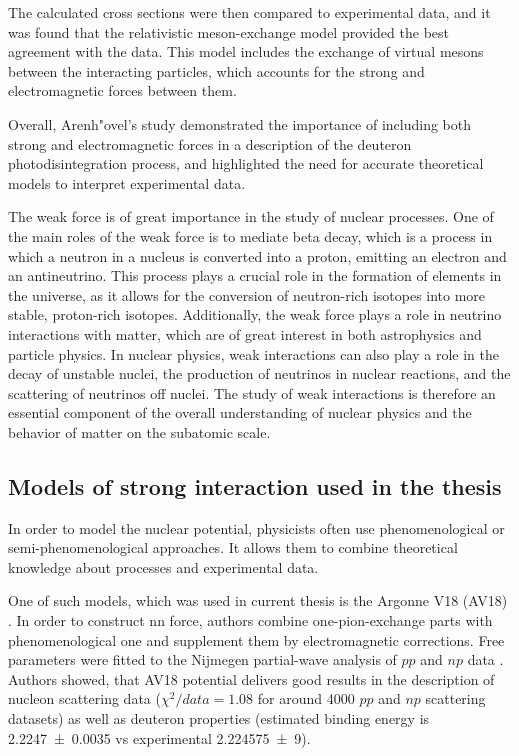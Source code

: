 The calculated cross sections were then compared to experimental data, and it was
found that the relativistic meson-exchange model provided
the best agreement with the data. This model includes the exchange of virtual mesons
between the interacting particles, which accounts for
the strong and electromagnetic forces between them.

Overall, Arenh"{o}vel's study demonstrated the importance of including both strong
and electromagnetic forces in a description of the deuteron photodisintegration process,
and highlighted the need for accurate theoretical models to interpret experimental data.


The weak force is of great importance in the study of nuclear processes. One of the main roles of the weak force is to mediate beta decay,
which is a process in which a neutron in a nucleus is converted into a proton, emitting an electron and an antineutrino. This process plays
a crucial role in the formation of elements in the universe, as it allows for the conversion of neutron-rich isotopes into more stable,
proton-rich isotopes. Additionally, the weak force plays a role in neutrino interactions with matter, which are of great interest in both
astrophysics and particle physics. In nuclear physics, weak interactions can also play a role in the decay of unstable nuclei, the
production of neutrinos in nuclear reactions, and the scattering of neutrinos off nuclei. The study of weak interactions is therefore an
essential component of the overall understanding of nuclear physics and the behavior of matter on the subatomic scale.



\subsection*{Models of strong interaction used in the thesis}

In order to model the nuclear potential, physicists often use phenomenological
or semi-phenomenological approaches. It allows them to combine
theoretical knowledge about processes and experimental data.

One of such models, which was used in current thesis is the Argonne V18 (AV18) \cite{AV18Wiringa}.
In order to construct \gls{nn} force, authors combine
one-pion-exchange parts
with phenomenological one and supplement them by electromagnetic corrections.
Free parameters were fitted to
the Nijmegen partial-wave analysis of $pp$ and $np$ data \cite{NijmegenPhysRevC.48.792}. 
Authors showed, that AV18 potential delivers good results
in the description of nucleon scattering data ($\chi ^2/data = 1.08$ for around \num{4000} $pp$ and $np$ scattering datasets) 
as well as deuteron properties (estimated binding energy is \SI{2.2247(35)}{\mev} vs experimental \SI{ 2.224 575(9)}{\mev}).

